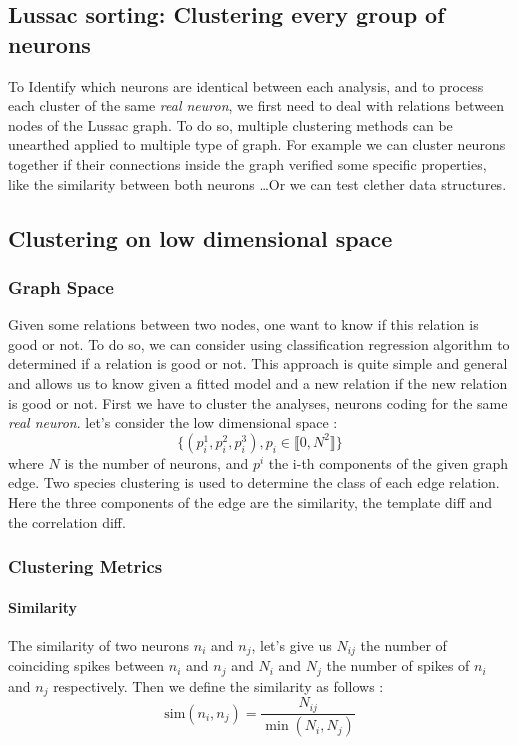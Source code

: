 \documentclass[11pt,a4paper]{report}
\begin{document}
\begin{multicols}{2}


    \chapter{Lussac sorting: Clustering every group of neurons}

    To Identify which neurons are identical between each analysis, and to process each cluster of the same \emph{real neuron}, we first need to deal with relations between nodes of the Lussac graph.
    To do so, multiple clustering methods can be unearthed applied to multiple type of graph. For example we can cluster neurons together if their connections inside the graph verified some specific properties, like the similarity between both neurons \dots Or we can test clether data structures.
    \section{Clustering on low dimensional space}
    \subsection{Graph Space}
    Given some relations between two nodes, one want to know if this relation is good or not. To do so, we can consider using
    classification regression algorithm to determined if a relation is good or not. This approach is quite simple and general and allows us to know given a fitted model and a new relation if the new relation is good or not.
    First we have to cluster the analyses, neurons coding for the same \emph{real neuron}.
    let's consider the low dimensional space :
    $$\{(p_i^1, p_i^2, p_i^3), p_i \in \llbracket 0,N^2 \rrbracket\}$$ where $N$ is the number of neurons, and $p^i$ the i-th components of the given graph edge.
    Two species clustering is used to determine the class of each edge relation. Here the three components of the edge are the similarity, the template diff and the correlation diff.
    \subsection{Clustering Metrics}
    \subsubsection{Similarity}
    The similarity of two neurons $n_i$ and $n_j$, let's give us $N_{ij}$ the number of coinciding spikes between $n_i$ and $n_j$ and $N_i$ and $N_j$ the number of spikes of $n_i$ and $n_j$ respectively. Then we define the similarity as follows :
    $$\text{sim}(n_i, n_j) = \frac{N_{ij}}{\min (N_i, N_j)}$$


\end{multicols}
\end{document}

